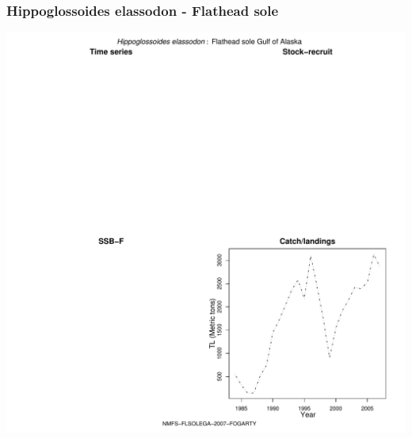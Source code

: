 \subsubsection{Hippoglossoides elassodon - Flathead sole}
\begin{center}
\includegraphics[width=1.2\textwidth]{../R/figures/NMFS-FLSOLEGA-2007-FOGARTY.pdf}
\end{center}

